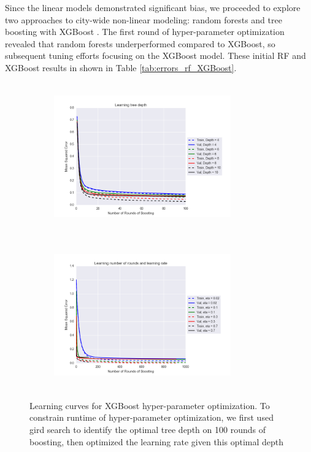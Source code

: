 \documentclass[journal]{IEEEtran}
\begin{document}
Since the linear models demonstrated significant bias, we proceeded to explore two approaches to city-wide non-linear modeling: random forests and tree boosting with XGBoost \cite{chen2016xgboost}. The first round of hyper-parameter optimization revealed that random forests underperformed compared to XGBoost, so subsequent tuning efforts focusing on the XGBoost model. These initial RF and XGBoost results in shown in Table \ref{tab:errors_rf_XGBoost}.


\begin{figure}[h!]
\begin{subfigure}
  \centering
  \includegraphics[width=3in,height=2.5in,clip,keepaspectratio]{XGB_model_3_depth_learning_lc.png}
\end{subfigure}
\begin{subfigure}
  \centering
  \includegraphics[width=3in,height=2.5in,clip,keepaspectratio]{XGB_model_3_num_round_eta_lc.png}
\end{subfigure}
\caption{Learning curves for XGBoost hyper-parameter optimization. To constrain runtime of hyper-parameter optimization, we first used gird search to identify the optimal tree depth on 100 rounds of boosting, then optimized the learning rate given this optimal depth}
\label{fig:xgb_learning_curves}
\end{figure}
\end{document}

